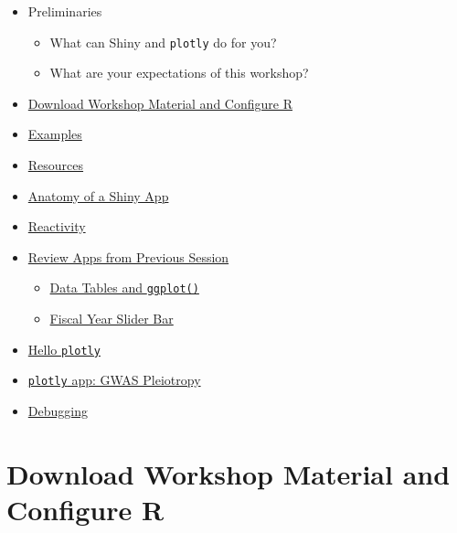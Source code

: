 \documentclass[10pt, letterpaper]{article}
\begin{document}
\begin{spacing}{1.0}
\begin{itemize}
    \item Preliminaries
      \begin{itemize}
        \item What can Shiny and \texttt{plotly} do for you?
        \item What are your expectations of this workshop?
      \end{itemize}
    \item \hyperref[sec:accesworkshopmaterial]{Download Workshop Material and Configure R}
    \item \hyperref[sec:examples]{Examples}
    \item \hyperref[sec:resources]{Resources}
    \item \hyperref[sec:anatomyofapp]{Anatomy of a Shiny App}
    \item \hyperref[sec:reactivity]{Reactivity}
    \item \hyperref[sec:prevapps]{Review Apps from Previous Session}
    \begin{itemize}
      \item \hyperref[sec:prevapp-dtggplot]{Data Tables and \texttt{ggplot()}}
      \item \hyperref[sec:prevapp-fyslider]{Fiscal Year Slider Bar}
    \end{itemize}
    \item \hyperref[sec:hello]{Hello \texttt{plotly}}
    \item \hyperref[sec:pleiotropy]{\texttt{plotly} app:  GWAS Pleiotropy}
    \item \hyperref[sec:debugging]{Debugging}
\end{itemize}




\section{Download Workshop Material and Configure R}\label{sec:accesworkshopmaterial}


\end{spacing}
\end{document}
